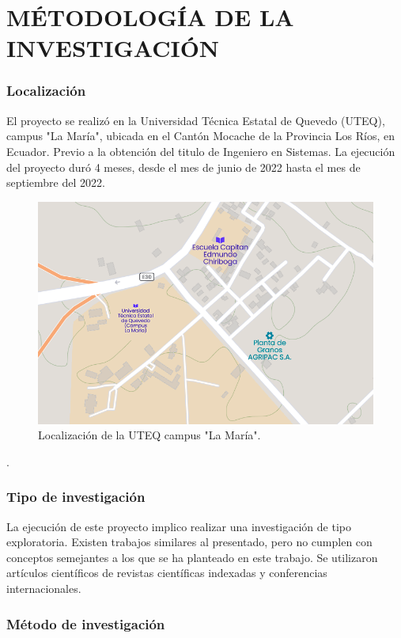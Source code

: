 \setcounter{chapter}{3}
\setcounter{section}{0}
\part{MÉTODOLOGÍA DE LA INVESTIGACIÓN} 

\section{Localización}

El proyecto se realizó en la Universidad Técnica Estatal de Quevedo (UTEQ), campus "La María", ubicada en el Cantón Mocache de la Provincia Los Ríos, en Ecuador. Previo a la obtención del titulo de Ingeniero en Sistemas. La ejecución del proyecto duró 4 meses, desde el mes de junio de 2022 hasta el mes de septiembre del 2022.

\begin{figure}[h!]
	\centering
	\includegraphics[width=12cm]{img/campuslamaria.png}
	\caption{Localización de la UTEQ campus "La María".}
	\label{fig:lamaria}
\end{figure}.

\section{Tipo de investigación}

La ejecución de este proyecto implico realizar una investigación de tipo exploratoria. Existen trabajos similares al presentado, pero no cumplen con conceptos semejantes a los que se ha planteado en este trabajo. Se utilizaron artículos científicos de revistas científicas indexadas y conferencias internacionales.

\section{Método de investigación}

